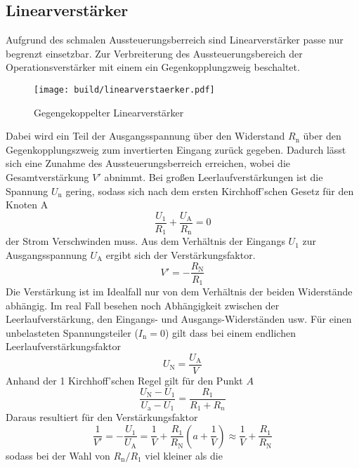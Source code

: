 \subsection{Linearverstärker}%
\label{sub:linearverstaerker}
Aufgrund des schmalen Aussteuerungsberreich sind Linearverstärker passe nur
begrenzt einsetzbar.
Zur Verbreiterung des Aussteuerungsbereich der Operationsverstärker mit einem 
ein Gegenkopplungzweig beschaltet.
\begin{figure}[h]
		\centering
		\texttt{[image: build/linearverstaerker.pdf]}
		\caption{Gegengekoppelter Linearverstärker \cite{anleitung}}
		\label{fig:lin}
\end{figure}
Dabei wird ein Teil der Ausgangsspannung über den Widerstand $R_\text{n}$ über
den Gegenkopplungszweig zum invertierten Eingang zurück gegeben. 
Dadurch lässt sich eine Zunahme des Aussteuerungsberreich erreichen, wobei die
Gesamtverstärkung $V'$ abnimmt.
Bei großen Leerlaufverstärkungen ist die Spannung $U_\text{n}$ gering, sodass
sich nach dem ersten Kirchhoff'schen Gesetz für den Knoten A
\begin{equation}
		\frac{U_1}{R_1} + \frac{U_\text{A}}{R_\text{n}} = 0
\end{equation}
der Strom Verschwinden muss. 
Aus dem Verhältnis der Eingangs $U_1$ zur Ausgangsspannung $U_\text{A}$ ergibt
sich der Verstärkungsfaktor.
\begin{equation}
		V' = - \frac{R_\text{N}}{R_1}
\end{equation}
Die Verstärkung ist im Idealfall nur von dem Verhältnis der beiden
Widerstände abhängig. 
Im real Fall besehen noch Abhängigkeit zwischen der Leerlaufverstärkung, den
Eingangs- und Ausgangs-Widerständen usw. 
Für einen unbelasteten Spannungsteiler ($I_\text{n} = 0$) gilt dass bei einem
endlichen Leerlaufverstärkungsfaktor
\begin{equation}
		U_\text{N} = \frac{U_\text{A}}{V}	
\end{equation}
Anhand der 1 Kirchhoff'schen Regel gilt für den Punkt $A$
\begin{equation}
		\frac{U_\text{N}-U_1}{U_\text{a}-U_1} = \frac{R_1}{R_1 + R_n}
\end{equation}
Daraus resultiert für den Verstärkungsfaktor 
\begin{equation}
		\frac{1}{V'}= - \frac{U_1}{U_\text{A}} = \frac{1}{V} +
		\frac{R_1}{R_\text{N}} \left( a + \frac{1}{V} \right) \approx
		\frac{1}{V} + \frac{R_1}{R_\text{N}}
\end{equation}
sodass bei der Wahl von $R_\text{n}/ R_\text{1}$ viel kleiner als die
